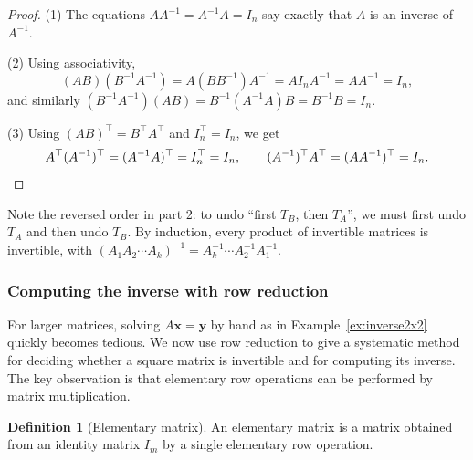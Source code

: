 \documentclass[11pt]{article}
\theoremstyle{definition}
\newtheorem{definition}{Definition}[section]
\theoremstyle{plain}
\theoremstyle{remark}
\begin{document}
\begin{proof}
    (1) The equations $A A^{-1} = A^{-1} A = I_n$ say exactly that $A$ is an inverse of $A^{-1}$.

    (2) Using associativity,
    \[(AB)(B^{-1}A^{-1}) = A(BB^{-1})A^{-1} = A I_n A^{-1} = AA^{-1} = I_n,\]
    and similarly $(B^{-1}A^{-1})(AB) = B^{-1}(A^{-1}A)B = B^{-1}B = I_n$.

    (3) Using $(AB)^\top = B^\top A^\top$ and $I_n^\top = I_n$, we get
    \[A^\top (A^{-1})^\top = (A^{-1}A)^\top = I_n^\top = I_n, \qquad (A^{-1})^\top A^\top = (AA^{-1})^\top = I_n. \qedhere\]
\end{proof}

Note the reversed order in part 2: to undo ``first $T_B$, then $T_A$'', we must first undo $T_A$ and then undo $T_B$. By induction, every product of invertible matrices is invertible, with $(A_1 A_2 \cdots A_k)^{-1} = A_k^{-1} \cdots A_2^{-1} A_1^{-1}$.

\subsubsection{Computing the inverse with row reduction}

For larger matrices, solving $A\mathbf{x} = \mathbf{y}$ by hand as in Example~\ref{ex:inverse2x2} quickly becomes tedious. We now use row reduction to give a systematic method for deciding whether a square matrix is invertible and for computing its inverse. The key observation is that elementary row operations can be performed by matrix multiplication.

\begin{definition}[Elementary matrix]
    An elementary matrix is a matrix obtained from an identity matrix $I_m$ by a single elementary row operation.
\end{definition}
\end{document}
